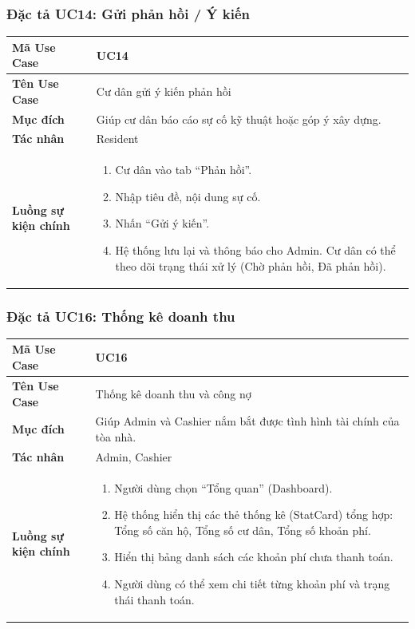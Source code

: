 \documentclass[12pt,a4paper]{article}
\begin{document}
\subsubsection{Đặc tả UC14: Gửi phản hồi / Ý kiến}
\begin{table}[H]
    \centering
    \renewcommand{\arraystretch}{1.2}
    \begin{tabularx}{\textwidth}{|l|X|}
    \hline
    \textbf{Mã Use Case} & \textbf{UC14} \\
    \hline
    \textbf{Tên Use Case} & Cư dân gửi ý kiến phản hồi \\
    \hline
    \textbf{Mục đích} & Giúp cư dân báo cáo sự cố kỹ thuật hoặc góp ý xây dựng. \\
    \hline
    \textbf{Tác nhân} & Resident \\
    \hline
    \textbf{Luồng sự kiện chính} &
    \begin{enumerate}
        \item Cư dân vào tab ``Phản hồi''.
        \item Nhập tiêu đề, nội dung sự cố.
        \item Nhấn ``Gửi ý kiến''.
        \item Hệ thống lưu lại và thông báo cho Admin. Cư dân có thể theo dõi trạng thái xử lý (Chờ phản hồi, Đã phản hồi).
    \end{enumerate} \\
    \hline
    \end{tabularx}
\end{table}

\subsubsection{Đặc tả UC16: Thống kê doanh thu}
\begin{table}[H]
    \centering
    \renewcommand{\arraystretch}{1.2}
    \begin{tabularx}{\textwidth}{|l|X|}
    \hline
    \textbf{Mã Use Case} & \textbf{UC16} \\
    \hline
    \textbf{Tên Use Case} & Thống kê doanh thu và công nợ \\
    \hline
    \textbf{Mục đích} & Giúp Admin và Cashier nắm bắt được tình hình tài chính của tòa nhà. \\
    \hline
    \textbf{Tác nhân} & Admin, Cashier \\
    \hline
    \textbf{Luồng sự kiện chính} &
    \begin{enumerate}
        \item Người dùng chọn ``Tổng quan'' (Dashboard).
                \item Hệ thống hiển thị các thẻ thống kê (StatCard) tổng hợp: Tổng số căn hộ, Tổng số cư dân, Tổng số khoản phí.
        \item Hiển thị bảng danh sách các khoản phí chưa thanh toán.
        \item Người dùng có thể xem chi tiết từng khoản phí và trạng thái thanh toán.
    \end{enumerate} \\
    \hline
    \end{tabularx}
\end{table}
\end{document}
